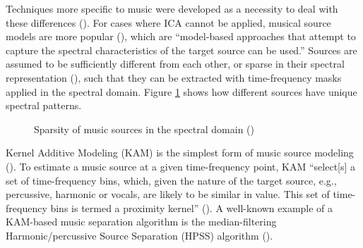 \documentclass[report.tex]{subfiles}
\begin{document}
Techniques more specific to music were developed as a necessity to deal with these differences (\cite{musicseptechniques1, musicseptechniques2}). For cases where ICA cannot be applied, musical source models are more popular (\cite[11]{musicsepgood}), which are ``model-based approaches that attempt to capture the spectral characteristics of the target source can be used.'' Sources are assumed to be sufficiently different from each other, or sparse in their spectral representation (\cite{musicsepgood}), such that they can be extracted with time-frequency masks applied in the spectral domain. Figure \ref{fig:sepgood} shows how different sources have unique spectral patterns.

\begin{figure}[ht]
	\centering
	\caption{Sparsity of music sources in the spectral domain (\cite[1, 3]{musicsepgood})}
\label{fig:sepgood}
\end{figure}

Kernel Additive Modeling (KAM) is the simplest form of music source modeling (\cite{musicsepgood}). To estimate a music source at a given time-frequency point, KAM ``select[s] a set of time-frequency bins, which, given the nature of the target source, e.g., percussive, harmonic or vocals, are likely to be similar in value. This set of time-frequency bins is termed a proximity kernel'' (\cite[11]{musicsepgood}). A well-known example of a KAM-based music separation algorithm is the median-filtering Harmonic/percussive Source Separation (HPSS) algorithm (\cite{fitzgerald1}).
\end{document}
